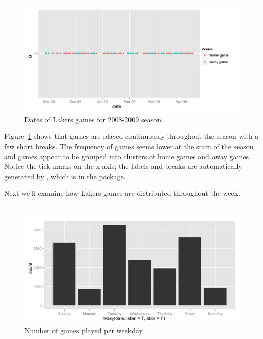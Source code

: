 \documentclass[article]{jss}
\begin{document}
\\
\\

\begin{figure}[htpb]
  \centering
  \includegraphics[width=\textwidth]{dates-points.png}        
  \caption{Dates of Lakers games for 2008-2009 season.}
  \label{fig:games-date}
\end{figure}

Figure~\ref{fig:games-date} shows that games are played continuously throughout the season with a few short breaks. The frequency of games seems lower at the start of the season and games appear to be grouped into clusters of home games and away games. Notice the tick marks on the x axis; the labels and breaks are automatically generated by , which is in the  package. 

Next we'll examine how Lakers games are distributed throughout the week.\\

\\

\begin{figure}[htpb]
  \centering    
    \includegraphics[width=\textwidth]{weekdays-histogram.png}     
  \caption{Number of games played per weekday.}
  \label{fig:games-days}
\end{figure}
\end{document}
